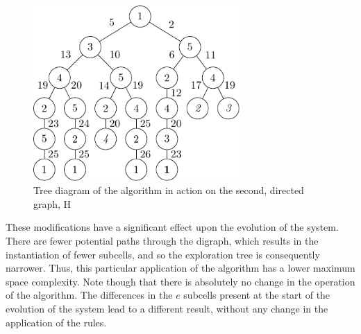 \begin{figure}
\centering
\includegraphics[width=0.7\textwidth]{chapters/tsp/figs/ugraph-figure3}
\caption[Tree diagram of the algorithm's operation on a directed graph]{\label{fig:tsp:dtree}Tree diagram of the algorithm in action on the second, directed graph, H}
\end{figure}

\begin{cpobjectsfloat}
\begin{cpobjects}
\end{cpobjects}
    \caption[Set of subcells from H in the skin membrane at the initial state]{\label{fig:tsp:obj1d}Set of subcells from H in the skin membrane at the initial state (those different from G are in bold)}
\end{cpobjectsfloat}

These modifications have a significant effect upon the evolution of the system.  There are fewer potential paths through the digraph, which results in the instantiation of fewer subcells, and so the exploration tree is consequently narrower.  Thus, this particular application of the algorithm has a lower maximum space complexity.  Note though that there is absolutely no change in the operation of the algorithm.  The differences in the \(e\) subcells present at the start of the evolution of the system lead to a different result, without any change in the application of the rules.

